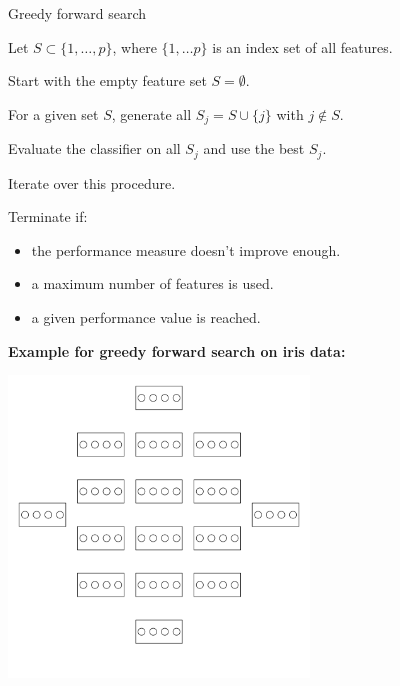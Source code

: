 \documentclass[11pt,compress,t,notes=noshow, xcolor=table]{beamer}
\begin{document}
  
  \begin{vbframe}{Greedy forward search}

    \begin{blocki}{}
      \item Let $S \subset \{1, \dots, p \}$, where $\{1, \dots p \}$ is an index set of all features.
      \item Start with the empty feature set $S = \emptyset$.
      \item For a given set $S$, generate all $S_j = S \cup \{j\}$ with $j \notin S$.
      \item Evaluate the classifier on all $S_j$ and use the best $S_j$.
      \item Iterate over this procedure.
      \item Terminate if:
        \begin{itemize}
          \item the performance measure doesn't improve enough.
          \item a maximum number of features is used.
          \item a given performance value is reached.
        \end{itemize}
    \end{blocki}

    \framebreak

    \textbf{Example for greedy forward search on iris data:}
    \begin{center}
    \includegraphics[width = 0.6\textwidth]{figure_man/wrapperanim1.png}
    \end{center}

    \framebreak


\end{vbframe}
\end{document}
